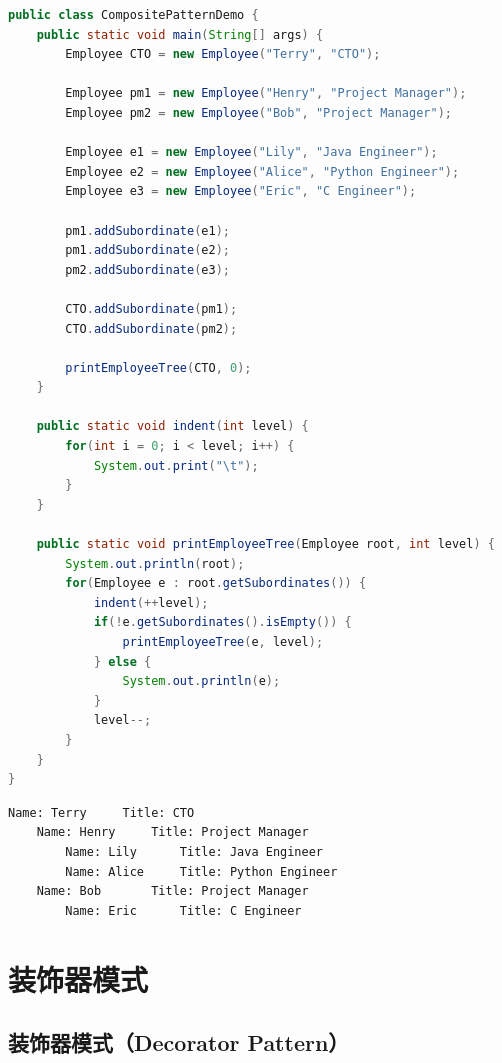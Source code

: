 \begin{lstlisting}[language=Java, title=CompositePatternDemo.java]
public class CompositePatternDemo {
    public static void main(String[] args) {
        Employee CTO = new Employee("Terry", "CTO");

        Employee pm1 = new Employee("Henry", "Project Manager");
        Employee pm2 = new Employee("Bob", "Project Manager");

        Employee e1 = new Employee("Lily", "Java Engineer");
        Employee e2 = new Employee("Alice", "Python Engineer");
        Employee e3 = new Employee("Eric", "C Engineer");

        pm1.addSubordinate(e1);
        pm1.addSubordinate(e2);
        pm2.addSubordinate(e3);

        CTO.addSubordinate(pm1);
        CTO.addSubordinate(pm2);

        printEmployeeTree(CTO, 0);
    }

    public static void indent(int level) {
        for(int i = 0; i < level; i++) {
            System.out.print("\t");
        }
    }

    public static void printEmployeeTree(Employee root, int level) {
        System.out.println(root);
        for(Employee e : root.getSubordinates()) {
            indent(++level);
            if(!e.getSubordinates().isEmpty()) {
                printEmployeeTree(e, level);
            } else {
                System.out.println(e);
            }
            level--;
        }
    }
}  
\end{lstlisting}

\begin{tcolorbox}
    \begin{verbatim}
Name: Terry		Title: CTO
    Name: Henry		Title: Project Manager
        Name: Lily		Title: Java Engineer
        Name: Alice		Title: Python Engineer
    Name: Bob		Title: Project Manager
        Name: Eric		Title: C Engineer
\end{verbatim}
\end{tcolorbox}

\newpage

\section{装饰器模式}

\subsection{装饰器模式（Decorator Pattern）}

